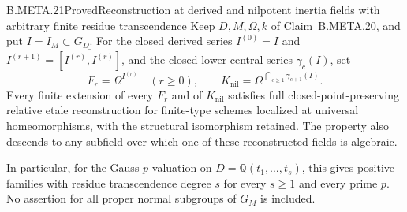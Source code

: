 \begin{claim}{B.META.21}{Proved}{Reconstruction at derived and nilpotent inertia fields with arbitrary finite residue transcendence}
Keep $D,M,\Omega,k$ of Claim~B.META.20, and put
$I=I_M\subset G_D$.
For the closed derived series $I^{(0)}=I$ and
$I^{(r+1)}=\overline{[I^{(r)},I^{(r)}]}$, and the
closed lower central series $\gamma_c(I)$, set
\[
 F_r=\Omega^{I^{(r)}}\quad(r\ge0),\qquad
 K_{\mathrm{nil}}=\Omega^{\,\bigcap_{c\ge1}\gamma_{c+1}(I)}.
                                                               \tag{META.DV5}
\]
Every finite extension of every $F_r$ and of
$K_{\mathrm{nil}}$ satisfies full closed-point-preserving
relative etale reconstruction for finite-type schemes
localized at universal homeomorphisms, with the
structural isomorphism retained.
The property also descends to any subfield over which
one of these reconstructed fields is algebraic.

In particular, for the Gauss $p$-valuation on
$D=\mathbb Q(t_1,\ldots,t_s)$, this gives positive
families with residue transcendence degree $s$ for
every $s\ge1$ and every prime $p$.
No assertion for all proper normal subgroups of
$G_M$ is included.
\end{claim}
